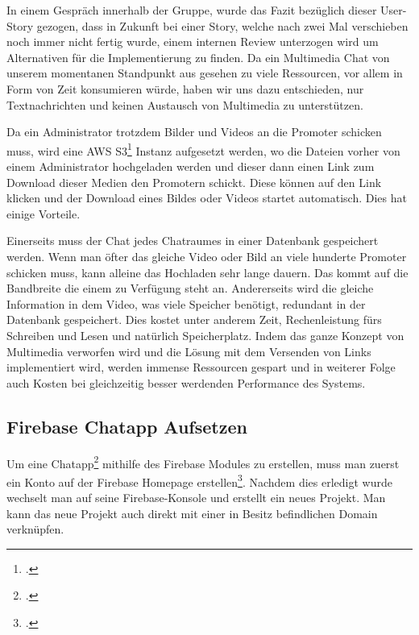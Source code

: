 In einem Gespräch innerhalb der Gruppe, wurde das Fazit bezüglich dieser User-Story gezogen, dass in Zukunft bei einer Story, welche nach zwei Mal verschieben noch immer nicht
fertig wurde, einem internen Review unterzogen wird um Alternativen für die Implementierung zu finden. Da ein Multimedia Chat von unserem momentanen Standpunkt aus gesehen zu viele
Ressourcen, vor allem in Form von Zeit konsumieren würde, haben wir uns dazu entschieden, nur Textnachrichten und keinen Austausch von Multimedia zu unterstützen.

Da ein Administrator trotzdem Bilder und Videos an die
Promoter schicken muss, wird eine AWS S3\footcite{aws-s3} Instanz aufgesetzt werden, wo die Dateien vorher von einem Administrator hochgeladen werden und dieser dann einen Link zum Download dieser Medien den Promotern schickt.
Diese können auf den Link klicken und der Download eines Bildes oder Videos startet automatisch. Dies hat einige Vorteile.

Einerseits muss der Chat jedes Chatraumes in einer Datenbank gespeichert werden. Wenn man öfter das gleiche Video oder Bild
an viele hunderte Promoter schicken muss, kann alleine das Hochladen sehr lange dauern.
Das kommt auf die Bandbreite die einem zu Verfügung steht an. Andererseits wird die gleiche Information in dem Video, was viele Speicher benötigt,
redundant in der Datenbank gespeichert. Dies kostet unter anderem Zeit, Rechenleistung fürs Schreiben und Lesen und natürlich Speicherplatz. Indem das ganze Konzept von Multimedia verworfen wird und die Lösung mit dem Versenden von
Links implementiert wird, werden immense Ressourcen gespart und in weiterer Folge auch Kosten bei gleichzeitig besser werdenden Performance des Systems.
\subsection{Firebase Chatapp Aufsetzen}
Um eine Chatapp\footcite{Chatapp-Beispiel} mithilfe des Firebase Modules zu erstellen, muss man zuerst ein Konto auf der Firebase Homepage erstellen\footcite{firebase-site}.
Nachdem dies erledigt wurde wechselt man auf seine Firebase-Konsole und erstellt ein neues Projekt. Man kann das neue Projekt auch direkt mit einer in Besitz befindlichen Domain verknüpfen.

